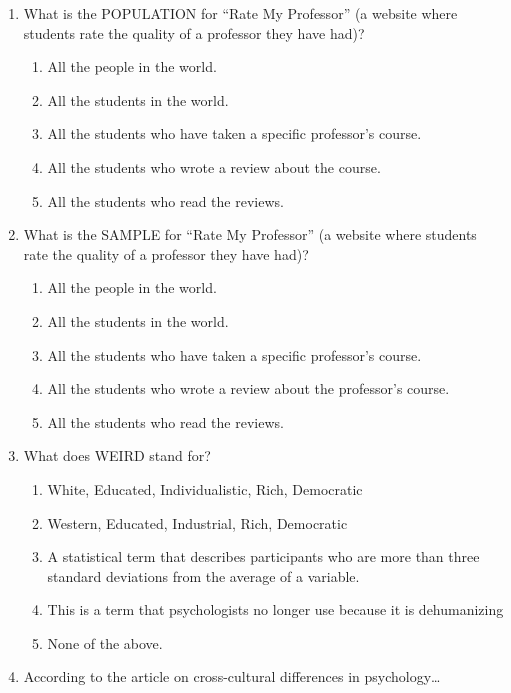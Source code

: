 \documentclass[
  letterpaper,
  DIV=11,
  numbers=noendperiod,
  oneside]{scrreprt}
\begin{document}
\begin{enumerate}
\def\labelenumi{\arabic{enumi}.}
\item
  What is the POPULATION for ``Rate My Professor'' (a website where
  students rate the quality of a professor they have had)?

  \begin{enumerate}
  \def\labelenumii{\arabic{enumii}.}
  \item
    All the people in the world.
  \item
    All the students in the world.
  \item
    All the students who have taken a specific professor's course.
  \item
    All the students who wrote a review about the course.
  \item
    All the students who read the reviews.
  \end{enumerate}
\item
  What is the SAMPLE for ``Rate My Professor'' (a website where students
  rate the quality of a professor they have had)?

  \begin{enumerate}
  \def\labelenumii{\arabic{enumii}.}
  \item
    All the people in the world.
  \item
    All the students in the world.
  \item
    All the students who have taken a specific professor's course.
  \item
    All the students who wrote a review about the professor's course.
  \item
    All the students who read the reviews.
  \end{enumerate}
\item
  What does WEIRD stand for?

  \begin{enumerate}
  \def\labelenumii{\arabic{enumii}.}
  \item
    White, Educated, Individualistic, Rich, Democratic
  \item
    Western, Educated, Industrial, Rich, Democratic
  \item
    A statistical term that describes participants who are more than
    three standard deviations from the average of a variable.
  \item
    This is a term that psychologists no longer use because it is
    dehumanizing
  \item
    None of the above.
  \end{enumerate}
\item
  According to the article on cross-cultural differences in
  psychology\ldots{}


\end{enumerate}
\end{document}
